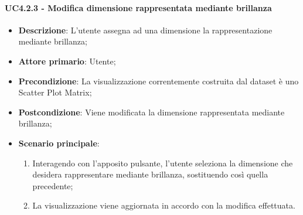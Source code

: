 \paragraph{UC4.2.3 - Modifica dimensione rappresentata mediante brillanza}
\label{par:uc4.2.3}
\begin{itemize}

    \item \textbf{Descrizione}:     L'utente assegna ad una dimensione la rappresentazione mediante brillanza;
    \item \textbf{Attore primario}: Utente;
    \item \textbf{Precondizione}:   La visualizzazione correntemente costruita dal dataset è uno Scatter Plot Matrix;
    \item \textbf{Postcondizione}:  Viene modificata la dimensione rappresentata mediante brillanza;
    \item \textbf{Scenario principale}:
    \begin{enumerate}
        \item   Interagendo con l'apposito pulsante, l'utente seleziona la dimensione che desidera rappresentare
                mediante brillanza, sostituendo così quella precedente;

        \item   La visualizzazione viene aggiornata in accordo con la modifica effettuata.
    \end{enumerate}
\end{itemize}

